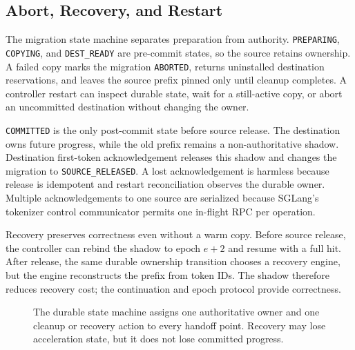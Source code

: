 \subsection{Abort, Recovery, and Restart}\label{abort-recovery-and-restart}

The migration state machine separates preparation from authority. \texttt{PREPARING}, \texttt{COPYING}, and \texttt{DEST\_READY} are pre-commit states, so the source retains ownership. A failed copy marks the migration \texttt{ABORTED}, returns uninstalled destination reservations, and leaves the source prefix pinned only until cleanup completes. A controller restart can inspect durable state, wait for a still-active copy, or abort an uncommitted destination without changing the owner.

\texttt{COMMITTED} is the only post-commit state before source release. The destination owns future progress, while the old prefix remains a non-authoritative shadow. Destination first-token acknowledgement releases this shadow and changes the migration to \texttt{SOURCE\_RELEASED}. A lost acknowledgement is harmless because release is idempotent and restart reconciliation observes the durable owner. Multiple acknowledgements to one source are serialized because SGLang's tokenizer control communicator permits one in-flight RPC per operation.

Recovery preserves correctness even without a warm copy. Before source release, the controller can rebind the shadow to epoch \(e+2\) and resume with a full hit. After release, the same durable ownership transition chooses a recovery engine, but the engine reconstructs the prefix from token IDs. The shadow therefore reduces recovery cost; the continuation and epoch protocol provide correctness.

\begin{figure}[t]
  \centering
  \caption{The durable state machine assigns one authoritative owner and one cleanup or recovery action to every handoff point. Recovery may lose acceleration state, but it does not lose committed progress.}
  \label{fig:state-machine}
\end{figure}

